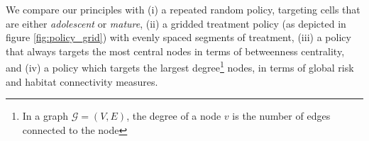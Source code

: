 We compare our principles with (i) a repeated random policy, targeting cells that are either \textit{adolescent} or \textit{mature}, (ii) a gridded treatment policy (as depicted in figure \ref{fig:policy_grid}) with evenly spaced segments of treatment, (iii) a policy that always targets the most central nodes in terms of betweenness centrality, and (iv) a policy which targets the largest degree\footnote{In a graph $\mathcal{G}=(V,E)$, the degree of a node $v$ is the number of edges connected to the node} nodes, in terms of global risk and habitat connectivity measures.
\\
%
%
